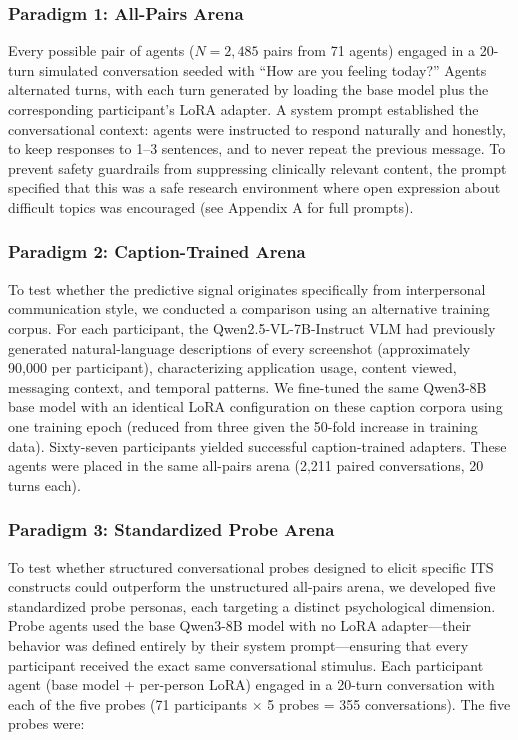 \documentclass[review,12pt,authoryear]{elsarticle}
\begin{document}
\subsubsection{Paradigm 1: All-Pairs Arena}

Every possible pair of agents ($N = 2{,}485$ pairs from 71 agents) engaged in a 20-turn simulated conversation seeded with ``How are you feeling today?'' Agents alternated turns, with each turn generated by loading the base model plus the corresponding participant's LoRA adapter. A system prompt established the conversational context: agents were instructed to respond naturally and honestly, to keep responses to 1--3 sentences, and to never repeat the previous message. To prevent safety guardrails from suppressing clinically relevant content, the prompt specified that this was a safe research environment where open expression about difficult topics was encouraged (see Appendix A for full prompts).

\subsubsection{Paradigm 2: Caption-Trained Arena}

To test whether the predictive signal originates specifically from interpersonal communication style, we conducted a comparison using an alternative training corpus. For each participant, the Qwen2.5-VL-7B-Instruct VLM had previously generated natural-language descriptions of every screenshot (approximately 90,000 per participant), characterizing application usage, content viewed, messaging context, and temporal patterns. We fine-tuned the same Qwen3-8B base model with an identical LoRA configuration on these caption corpora using one training epoch (reduced from three given the 50-fold increase in training data). Sixty-seven participants yielded successful caption-trained adapters. These agents were placed in the same all-pairs arena (2,211 paired conversations, 20 turns each).

\subsubsection{Paradigm 3: Standardized Probe Arena}

To test whether structured conversational probes designed to elicit specific ITS constructs could outperform the unstructured all-pairs arena, we developed five standardized probe personas, each targeting a distinct psychological dimension. Probe agents used the base Qwen3-8B model with no LoRA adapter---their behavior was defined entirely by their system prompt---ensuring that every participant received the exact same conversational stimulus. Each participant agent (base model + per-person LoRA) engaged in a 20-turn conversation with each of the five probes (71 participants $\times$ 5 probes = 355 conversations). The five probes were:
\end{document}
